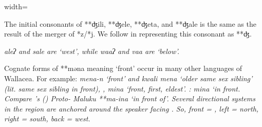 \begin{table}
\begin{adjustbox}{width=\textwidth}
\begin{threeparttable}
\begin{tablenotes}
			\item[‡]	{The initial consonants of **ʤili,
								**ʤele, **ʤeta, and **ʤale is the same as the result of the merger of *z/*j.
								We follow \citet{Elias2018} in representing this consonant as **ʤ.}
			\item[Δ]	{ \it{aleʔ}
								and  \it{sale} are ‘west’,
								while \it{waaʔ} and \it{vaa} are ‘below’.}
			\item[‖]	{Cognate forms of **məna meaning `front'
								occur in many other languages of Wallacea.
								For example:  \it{mena-n} ‘front’ and
								 \it{kwali mena} ‘older same sex sibling’
								(lit. same sex sibling in front),
								, \it{mina} ‘front, first, eldest’.
								: \it{mina} ‘in front.
								Compare \citeauthor{Stresemann1927}'s
								(\citeyear[113]{Stresemann1927})
								Proto- Maluku **ma-ina ‘in front of’.
								Several directional systems in the
								region are anchored around
								the speaker facing .
								So, front = , left = north,
								right = south, back = west.}
		\end{tablenotes}
	\end{threeparttable}
\end{adjustbox}
\end{table}

